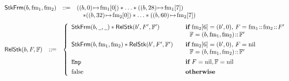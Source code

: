 \begin{figure}[!t]
    \centering
    \small
    \[
        \begin{array}{l}
            \hspace*{-0.15em}
            \begin{array}{lcl}
                \RelStkFm{\block}{\fm_1}{\fm_2} & \define & 
                (\msto{(\block, 0)}{\fm_1[0]}) \sepstar \dots \sepstar 
                (\msto{(\block, 28)}{\fm_1[7]}) \\
                & & \quad \sepstar 
                (\msto{(\block, 32)}{\fm_2[0]}) \sepstar 
                \dots \sepstar
                (\msto{(\block, 60)}{\fm_2[7]})
            \end{array} \\
            \\[-5pt]
            \hspace*{-0.15em}
            \begin{array}{lcl}
                \RelStk{\block}{\Wstack}{\hWstk} & \define & 
                \left\{
                    \begin{array}{ll}
                        \RelStkFm{\block}{\notCare}{\notCare} \sepstar
                        \RelStk{\block'}{\Wstack'}{\hWstk'} & 
                            \quad \cif \  
                            \fm_2[6] = (\block', 0), \, \Wstack = \fm_1 \stCons \fm_2 \stCons \Wstack' \\
                            & \quad \ \ \hWstk = (\block, \fm_1, \fm_2) \stCons \hWstk' \\
                            \\[-8pt]
                        \RelStkFm{\block}{\fm_1}{\fm_2} \sepstar 
                        \RelStk{\block'}{\Wstack'}{\hWstk'} & 
                            \quad \cif \ 
                            \fm_2[6] = (\block', 0), \, \Wstack = \nil \\
                            & \quad \ \ \hWstk = (\block, \fm_1, \fm_2) \stCons \hWstk' \\
                            \\[-8pt]
                        \empAst & \quad \cif \ \Wstack = \nil, \hWstk = \nil \\
                            \\[-8pt]
                        \afalse & \quad \otherwise
                    \end{array}
                \right. 
            \end{array} \\

\end{array}\]
\end{figure}
